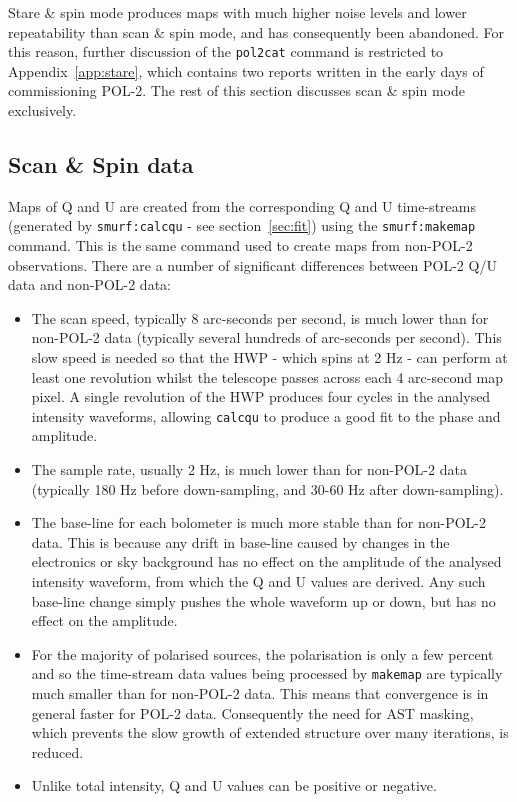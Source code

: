 \documentclass[twoside,11pt]{starlink}
\begin{document}
Stare \& spin mode produces maps with much higher noise levels and lower
repeatability than scan \& spin mode, and has consequently been
abandoned. For this reason, further discussion of the \texttt{pol2cat}
command is restricted to Appendix~\ref{app:stare}, which contains two
reports written in the early days of commissioning POL-2. The rest of this
section discusses scan \& spin mode exclusively.

\subsection{Scan \& Spin data}
Maps of Q and U are created from the corresponding Q and U time-streams
(generated by \texttt{smurf:calcqu} - see section~\ref{sec:fit}) using the
\texttt{smurf:makemap} command. This is the same command used to
create maps from non-POL-2 observations. There are a number of significant
differences between POL-2 Q/U data and non-POL-2 data:
\begin{itemize}
\item The scan speed, typically 8 arc-seconds per second, is much lower
than for non-POL-2 data (typically several hundreds of arc-seconds per
second). This slow speed is needed so that the HWP - which spins at 2 Hz -
can perform at least one revolution whilst the telescope passes across
each 4 arc-second map pixel.  A single revolution of the HWP produces
four cycles in the analysed intensity waveforms, allowing \texttt{calcqu}
to produce a good fit to the phase and amplitude.
\item The sample rate, usually 2 Hz, is much lower than for non-POL-2
data (typically 180 Hz before down-sampling, and 30-60 Hz after
down-sampling).
\item The base-line for each bolometer is much more stable than for
non-POL-2 data. This is because any drift in base-line caused by changes
in the electronics or sky background has no effect on the amplitude of
the analysed intensity waveform, from which the Q and U values are derived.
Any such base-line change simply pushes the whole waveform up or down,
but has no effect on the amplitude.
\item For the majority of polarised sources, the polarisation is only a
few percent and so the time-stream data values being processed by
\texttt{makemap} are typically much smaller than for non-POL-2 data. This
means that convergence is in general faster for POL-2 data. Consequently
the need for AST masking, which prevents the slow growth of extended
structure over many iterations, is reduced.
\item Unlike total intensity, Q and U values can be positive or negative.
\end{itemize}
\end{document}
